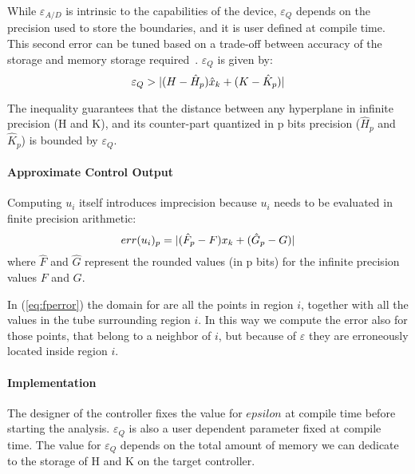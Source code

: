 While $\varepsilon_{A/D}$ is intrinsic to the capabilities of the device,
$\varepsilon_{Q}$ depends on the precision used to store the boundaries, and it is user defined at compile time. This
second error can be tuned based on a trade-off between accuracy of the storage and
memory storage required~\cite{memoryMPC}.
%
$\varepsilon_{Q}$ is given by:
\begin{equation}\label{eq:quantizationlines}
  \varepsilon_{Q} > |(H-\hat{H}_{p})\hat{x}_{k}+(K-\hat{K}_{p})|
\end{equation}

The inequality guarantees that the distance between any hyperplane in infinite precision (H and K), and its counter-part quantized in p bits precision ($\hat{H}_{p}$ and $\hat{K}_{p}$) is bounded by $\varepsilon_{Q}$.


\paragraph{Approximate Control Output}

Computing $u_{i}$ itself introduces imprecision because $u_i$ needs to be evaluated 
in finite precision arithmetic:
\begin{equation}\label{eq:fperror}
  err(u_{i})_{p}=|(\hat{F}_{p}-F)x_{k}+(\hat{G}_{p}-G)|
\end{equation}
where $\hat{F}$ and $\hat{G}$ represent the rounded values (in p bits) for the infinite precision values $F$ and $G$.

In (\ref{eq:fperror}) the domain for \statevarmath are all the points in region $i$, together with all the values in the tube surrounding region $i$. 
In this way we compute the error also for those points, that belong to a neighbor of $i$, but because of $\varepsilon$ they are erroneously located inside region $i$.

\paragraph{Implementation}

The designer of the controller fixes the value for $epsilon$ at compile time before starting the analysis. $\varepsilon_{Q}$ is also a user dependent parameter fixed at compile time. The value for $\varepsilon_{Q}$ depends on the total amount of memory we can dedicate to the storage of H and K on the target controller.

